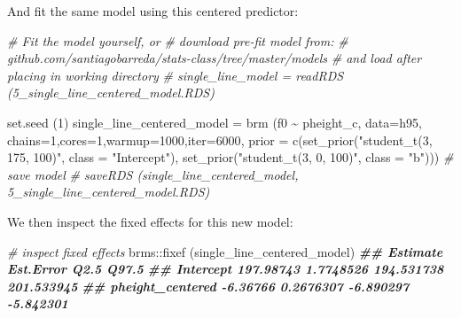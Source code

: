 \documentclass[
]{book}
\newenvironment{Shaded}{\begin{snugshade}}{\end{snugshade}}
\newcommand{\AttributeTok}[1]{\textcolor[rgb]{0.77,0.63,0.00}{#1}}
\newcommand{\CommentTok}[1]{\textcolor[rgb]{0.56,0.35,0.01}{\textit{#1}}}
\newcommand{\DecValTok}[1]{\textcolor[rgb]{0.00,0.00,0.81}{#1}}
\newcommand{\DocumentationTok}[1]{\textcolor[rgb]{0.56,0.35,0.01}{\textbf{\textit{#1}}}}
\newcommand{\FunctionTok}[1]{\textcolor[rgb]{0.00,0.00,0.00}{#1}}
\newcommand{\NormalTok}[1]{#1}
\newcommand{\OtherTok}[1]{\textcolor[rgb]{0.56,0.35,0.01}{#1}}
\newcommand{\SpecialCharTok}[1]{\textcolor[rgb]{0.00,0.00,0.00}{#1}}
\newcommand{\StringTok}[1]{\textcolor[rgb]{0.31,0.60,0.02}{#1}}
\begin{document}
\begin{Shaded}
\end{Shaded}

And fit the same model using this centered predictor:

\begin{Shaded}
\begin{Highlighting}[]
\CommentTok{\# Fit the model yourself, or}
\CommentTok{\# download pre{-}fit model from: }
\CommentTok{\# github.com/santiagobarreda/stats{-}class/tree/master/models}
\CommentTok{\# and load after placing in working directory}
\CommentTok{\# single\_line\_model = readRDS (\textquotesingle{}5\_single\_line\_centered\_model.RDS\textquotesingle{})}

\FunctionTok{set.seed}\NormalTok{ (}\DecValTok{1}\NormalTok{)}
\NormalTok{single\_line\_centered\_model }\OtherTok{=}
  \FunctionTok{brm}\NormalTok{ (f0 }\SpecialCharTok{\textasciitilde{}}\NormalTok{ pheight\_c, }\AttributeTok{data=}\NormalTok{h95, }\AttributeTok{chains=}\DecValTok{1}\NormalTok{,}\AttributeTok{cores=}\DecValTok{1}\NormalTok{,}\AttributeTok{warmup=}\DecValTok{1000}\NormalTok{,}\AttributeTok{iter=}\DecValTok{6000}\NormalTok{,}
       \AttributeTok{prior =} \FunctionTok{c}\NormalTok{(}\FunctionTok{set\_prior}\NormalTok{(}\StringTok{"student\_t(3, 175, 100)"}\NormalTok{, }\AttributeTok{class =} \StringTok{"Intercept"}\NormalTok{),}
                 \FunctionTok{set\_prior}\NormalTok{(}\StringTok{"student\_t(3, 0, 100)"}\NormalTok{, }\AttributeTok{class =} \StringTok{"b"}\NormalTok{)))}
\CommentTok{\# save model}
\CommentTok{\# saveRDS (single\_line\_centered\_model, \textquotesingle{}5\_single\_line\_centered\_model.RDS\textquotesingle{})}
\end{Highlighting}
\end{Shaded}

We then inspect the fixed effects for this new model:

\begin{Shaded}
\begin{Highlighting}[]
\CommentTok{\# inspect fixed effects}
\NormalTok{brms}\SpecialCharTok{::}\FunctionTok{fixef}\NormalTok{ (single\_line\_centered\_model)}
\DocumentationTok{\#\#                   Estimate Est.Error       Q2.5      Q97.5}
\DocumentationTok{\#\# Intercept        197.98743 1.7748526 194.531738 201.533945}
\DocumentationTok{\#\# pheight\_centered  {-}6.36766 0.2676307  {-}6.890297  {-}5.842301}
\end{Highlighting}
\end{Shaded}
\end{document}
